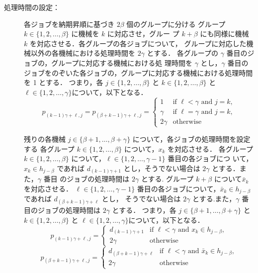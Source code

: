 \documentclass[12pt]{optlab-bachelor}
\begin{document}
\begin{description}
\begin{displaymath}
  \end{displaymath}
  \item[処理時間の設定：] 各ジョブを納期昇順に基づき $2\beta$ 個のグループに分ける
  グループ $k \in \{1,2,\ldots,\beta\}$ に機械を $k$ に対応させ，グルー
  プ $k + \beta$ にも同様に機械 $k$ を対応させる．各グループの各ジョブについて， グループに対応した機械以外の各機械における処理時間を $2\gamma$ とする．
  各グループの $\gamma$ 番目のジョブの，グループに対応する機械における処
  理時間を $\gamma$ とし，$\gamma$ 番目のジョブをのぞいた各ジョブの，グループに対応する機械における処理時間を 1 とする．
  つまり，各 $j \in \{1,2,\ldots, \beta\}$ と $k \in \{1,2,\ldots,
  \beta\}$ と $\ell \in \{1,2,\ldots, \gamma\}$について，以下となる．
  \begin{displaymath}
    p_{(k - 1)\gamma + \ell, j} = p_{(\beta + k - 1)\gamma + \ell, j} = \left\{ \begin{array}{ll} 1 & \text{if } \ell < \gamma \text{ and } j = k, \\ \gamma & \text{if } \ell = \gamma \text{ and } j = k, \\ 2\gamma & \text{otherwise}\end{array} \right.
  \end{displaymath}

  残りの各機械 $j \in \{\beta + 1, \ldots , \beta + \gamma\}$ について，各ジョブの処理時間を設定する
  各グループ $k \in \{1,2,\ldots,\beta\}$ について，$x_k$ を対応させる．
  各グループ $k \in \{1,2,\ldots,\beta\}$ について，$\ell \in \{1,2,\ldots, \gamma - 1\}$ 番目の各ジョブにつ いて，$x_k \in h_{j - \beta}$ であれば $d_{(k - 1)\gamma + 1}$ とし，そうでない場合は $2\gamma$ とする．また，$\gamma$ 番目 のジョブの処理時間は $2\gamma$ とする.
  グループ $k + \beta$ について$\bar x_k$ を対応させる．
  $\ell \in \{1,2,\ldots, \gamma - 1\}$ 番目の各ジョブについて，$\bar x_k \in h_{j - \beta}$ であれば $d_{(\beta + k - 1)\gamma + \ell}$ とし， そうでない場合は $2\gamma$ とする.また，$\gamma$ 番目のジョブの処理時間は $2\gamma$ とする．
  つまり，各 $j \in \{\beta + 1,\ldots, \beta + \gamma\}$ と $k \in
  \{1,2,\ldots, \beta\}$ と $\ell \in \{1,2,\ldots, \gamma\}$について，以下となる．
  \begin{displaymath}
    p_{(k - 1)\gamma + \ell, j} = \left\{ \begin{array}{ll} d_{(k - 1)\gamma + 1} & \text{if } \ell < \gamma \text{ and } x_k \in h_{j - \beta}, \\ 2\gamma & \text{otherwise} \end{array} \right.
  \end{displaymath}
  \begin{displaymath}
    p_{(\beta + k - 1)\gamma + \ell, j} = \left\{ \begin{array}{ll} d_{(\beta + k - 1)\gamma + \ell} & \text{if } \ell < \gamma \text{ and } \bar x_k \in h_{j - \beta}, \\ 2\gamma & \text{otherwise} \end{array} \right.
  \end{displaymath}
\end{description}
\end{document}
